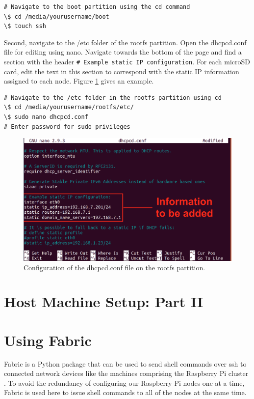 \documentclass[sigconf]{acmart}
\begin{document}
\begin{lstlisting}
# Navigate to the boot partition using the cd command
\$ cd /media/yourusername/boot
\$ touch ssh
\end{lstlisting}

Second, navigate to the /etc folder of the rootfs partition. Open the dhcpcd.conf file for editing using nano. Navigate 
towards the bottom of the page and find a section with the header {\tt \# Example static IP configuration}. For each microSD 
card, edit the text in this section to correspond with the static IP information assigned to each node. Figure 
\ref{f:dhcpcd2} gives an example.

\begin{lstlisting}
# Navigate to the /etc folder in the rootfs partition using cd
\$ cd /media/yourusername/rootfs/etc/
\$ sudo nano dhcpcd.conf
# Enter password for sudo privileges 
\end{lstlisting}

\begin{figure}[!ht]
  \centering\includegraphics[width=\columnwidth]{images/dhcpcd2.png}
  \caption{Configuration of the dhcpcd.conf file on the rootfs partition.}\label{f:dhcpcd2}
\end{figure}

\section{Host Machine Setup: Part II}

\section{Using Fabric}

Fabric is a Python package that can be used to send shell commands over ssh to connected network devices like the machines 
comprising the Raspberry Pi cluster \cite{fabric2018}. To avoid the redundancy of configuring our Raspberry Pi nodes one at 
a time, Fabric is used here to issue shell commands to all of the nodes at the same time.
\end{document}
